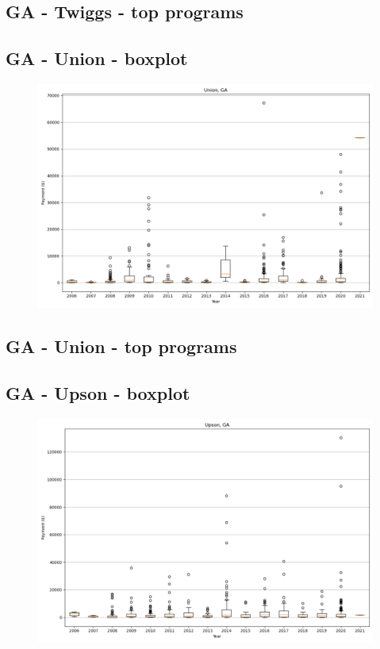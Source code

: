 \subsection*{GA - Twiggs - top programs}

\newpage
\subsection*{GA - Union - boxplot}
\begin{figure}[h]
\centering
\includegraphics[width=7in]{../output/boxplots/counties/Union-GA_boxplot.png}
\end{figure}


\subsection*{GA - Union - top programs}

\newpage
\subsection*{GA - Upson - boxplot}
\begin{figure}[h]
\centering
\includegraphics[width=7in]{../output/boxplots/counties/Upson-GA_boxplot.png}
\end{figure}


